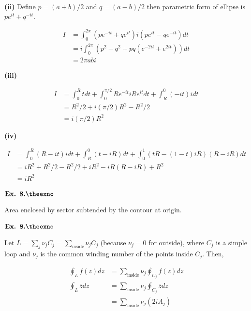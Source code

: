 \documentclass{article}
\def\tf{\textbf}
\newcounter{exno}
\begin{document}
\tf{(ii)} Define $p = (a+b)/2$ and $q = (a-b)/2$ then parametric form of ellipse is $pe^{it} + q^{-it}$.

\begin{align*}
    I &= \int_{0}^{2\pi} (pe^{-it} + qe^{it})i(pe^{it}-qe^{-it})dt\\
    &= i\int_{0}^{2\pi} (p^2 - q^2 + pq(e^{-2it} + e^{2it})) dt\\
    &= 2\pi a b i
\end{align*}

\tf{(iii)}

\begin{align*}
    I &= \int_{0}^{R}tdt + \int_{0}^{\pi/2}Re^{-it}iRe^{it}dt + \int_{R}^{0}(-it)idt\\
    &= R^2/2 + i(\pi/2)R^2 - R^2/2\\
    &= i(\pi/2)R^2
\end{align*}

\tf{(iv)}

\begin{align*}
    I &= \int_{0}^{R}(R-it)idt + \int_{R}^{0}(t - iR)dt + \int_{0}^{1}(tR - (1-t)iR)(R-iR)dt\\
    &= iR^2 + R^2/2 - R^2/2 + iR^2 -iR(R-iR) + R^2\\
    &= iR^2
\end{align*}

\vspace{0.2in}

${\textbf{Ex. 8.\theexno}}$\addtocounter{exno}{1} Area enclosed by sector subtended by the contour at origin.

\vspace{0.2in}

${\textbf{Ex. 8.\theexno}}$\addtocounter{exno}{1} Let $L = \sum_{j}\nu_j C_j = \sum_{\text{inside}}\nu_jC_j$ (because $\nu_j = 0$ for outside), where $C_j$ is a simple loop and $\nu_j$ is the common winding number of the points inside $C_j$. Then,

\begin{align*}
    \oint_{L}f(z)dz &= \sum_{\text{inside}}\nu_j\oint_{C_j}f(z)dz\\
    \oint_{L}\bar{z}dz &= \sum_{\text{inside}}\nu_j\oint_{C_j}\bar{z}dz\\
    &= \sum_{\text{inside}}\nu_j(2i A_j)
\end{align*}

\vspace{0.2in}
\end{document}
